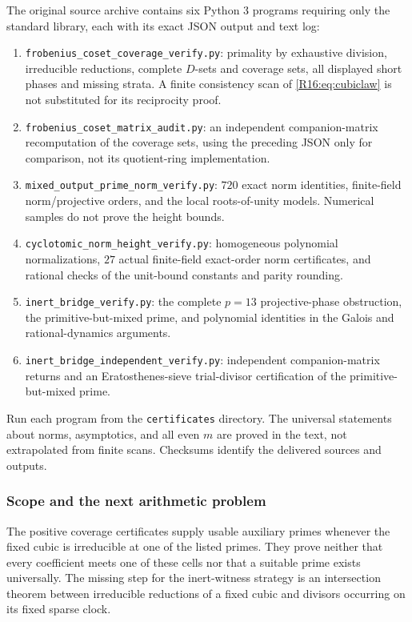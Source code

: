 \documentclass[11pt,a4paper]{article}
\theoremstyle{definition}\newtheorem{definition}[theorem]{Definition}
\theoremstyle{remark}\newtheorem{remark}[theorem]{Remark}
\begin{document}
The original source archive contains six Python 3 programs requiring only the standard
library, each with its exact JSON output and text log:
\begin{enumerate}
\item \texttt{frobenius\_coset\_coverage\_verify.py}: primality by exhaustive
 division, irreducible reductions, complete $D$-sets and coverage sets,
 all displayed short phases and missing strata. A finite consistency scan
 of \eqref{R16:eq:cubiclaw} is not substituted for its reciprocity proof.
\item \texttt{frobenius\_coset\_matrix\_audit.py}: an independent
 companion-matrix recomputation of the coverage sets, using the preceding
 JSON only for comparison, not its quotient-ring implementation.
\item \texttt{mixed\_output\_prime\_norm\_verify.py}: $720$ exact norm
 identities, finite-field norm/projective orders, and the local
 roots-of-unity models. Numerical samples do not prove the height bounds.
\item \texttt{cyclotomic\_norm\_height\_verify.py}: homogeneous polynomial
 normalizations, $27$ actual finite-field exact-order norm certificates,
 and rational checks of the unit-bound constants and parity rounding.
\item \texttt{inert\_bridge\_verify.py}: the complete $p=13$ projective-phase
 obstruction, the primitive-but-mixed prime, and polynomial identities
 in the Galois and rational-dynamics arguments.
\item \texttt{inert\_bridge\_independent\_verify.py}: independent
 companion-matrix returns and an Eratosthenes-sieve trial-divisor
 certification of the primitive-but-mixed prime.
\end{enumerate}
Run each program from the \texttt{certificates} directory. The universal
statements about norms, asymptotics, and all even $m$ are proved in the
text, not extrapolated from finite scans. Checksums identify the delivered
sources and outputs. 

\subsubsection{Scope and the next arithmetic problem}

The positive coverage certificates supply usable auxiliary primes whenever
the fixed cubic is irreducible at one of the listed primes. They prove
neither that every coefficient meets one of these cells nor that a suitable
prime exists universally. The missing step for the inert-witness strategy
is an intersection theorem between irreducible reductions of a fixed
cubic and divisors occurring on its fixed sparse clock.
\end{document}
